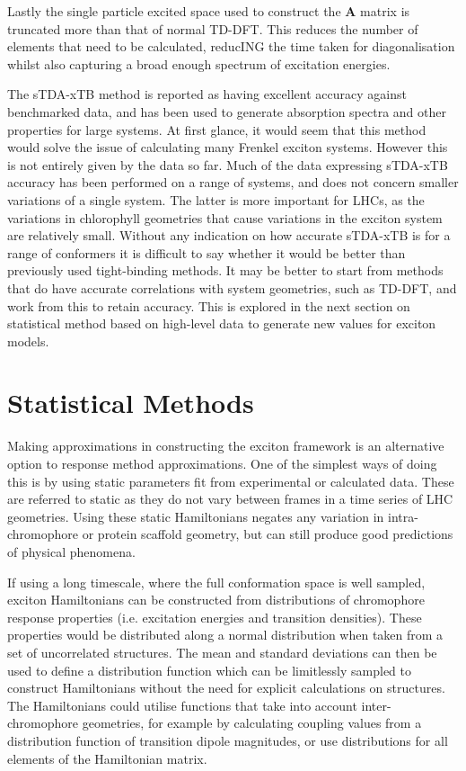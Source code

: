 Lastly the single particle excited space used to construct the $\mathbf{A}$ matrix
is truncated more than that of normal TD-DFT. This reduces the number of elements
that need to be calculated, reducING the time taken for diagonalisation whilst also
capturing a broad enough spectrum of excitation energies. 

The sTDA-xTB method is reported as having excellent accuracy against benchmarked
data, and has been used to generate absorption spectra and other properties for 
large systems. At first glance, it would seem that this method would solve the issue
of calculating many Frenkel exciton systems. However this is not entirely given 
by the data so far. Much of the data expressing sTDA-xTB accuracy has been performed 
on a range of systems, and does not concern smaller variations of a single system. 
The latter is more important for LHCs, as the variations in chlorophyll geometries
that cause variations in the exciton system are relatively small. Without any indication
on how accurate sTDA-xTB is for a range of conformers it is difficult to say whether
it would be better than previously used tight-binding methods. It may be better 
to start from methods that do have accurate correlations with system geometries, 
such as TD-DFT, and work from this to retain accuracy. This is explored in the next
section on statistical method based on high-level data to generate new values for
exciton models.

\section{Statistical Methods}
\label{sec:stats_methods}

Making approximations in constructing the exciton framework is an alternative option
to response method approximations. One of the simplest ways of doing this is by 
using static parameters fit from experimental or calculated data. These are referred
to static as they do not vary between frames in a time series of LHC geometries. 
Using these static Hamiltonians negates any variation in intra-chromophore or protein
scaffold geometry, but can still produce good predictions of physical phenomena.

If using a long timescale, where the full conformation space is well sampled, exciton
Hamiltonians can be constructed from distributions of chromophore response properties
(i.e. excitation energies and transition densities). These properties would be distributed
along a normal distribution when taken from a set of uncorrelated structures. The
mean and standard deviations can then be used to define a distribution function 
which can be limitlessly sampled to construct Hamiltonians without the need for 
explicit calculations on structures. The Hamiltonians could utilise functions that 
take into account inter-chromophore geometries, for example by calculating coupling
values from a distribution function of transition dipole magnitudes, or use distributions
for all elements of the Hamiltonian matrix.

